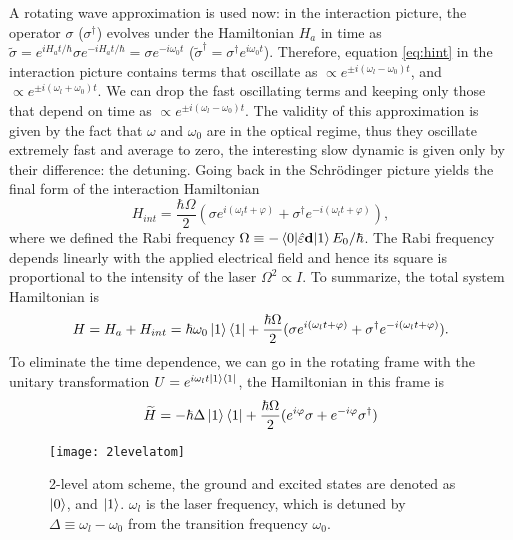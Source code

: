 A rotating wave approximation is used now: in the interaction picture, the operator $\sigma$ ($\sigma^\dagger$) evolves under the Hamiltonian $H_a$ in time as $\widetilde{\sigma} = e^{i H_a t/\hbar}\sigma e^{-i H_a t/\hbar} = \sigma e^{-i\omega_0 t}$ ($\widetilde{\sigma}^\dagger=\sigma^\dagger e^{i\omega_0 t}$). Therefore, equation \ref{eq:hint} in the interaction picture contains terms that oscillate as $\propto e^{\pm i(\omega_l-\omega_0 )t}$, and $\propto e^{\pm i(\omega_l+\omega_0 )t}$. We can drop the fast oscillating terms and keeping only those that depend on time as $\propto e^{\pm i(\omega_l-\omega_0 )t}$. The validity of this approximation is given by the fact that $\omega$ and $\omega_0$ are in the optical regime, thus they oscillate extremely fast and average to zero, the interesting slow dynamic is given only by their difference: the detuning.
Going back in the Schrödinger picture yields the final form of the interaction Hamiltonian
\begin{equation}
H_{int} = \frac{\hbar \Omega}{2}(\sigma e^{i(\omega_l t+\varphi)} + \sigma^\dagger e^{-i(\omega_l t+\varphi)}),
\end{equation}
 where we defined the Rabi frequency $\Omega \equiv - \braket{0|\hat{\varepsilon} \mathbf{d}|1}E_0/\hbar$. The Rabi frequency depends linearly with the applied electrical field and hence its square is proportional to the intensity of the laser $\Omega ^2 \propto I$. To summarize, the total system Hamiltonian is
 \begin{equation}
 \label{2levelatomhamiltonian}
H = H_a + H_{int} = \hbar\omega_0 \ket{1}\bra{1} + \frac{\hbar \Omega}{2}(\sigma e^{i(\omega_l t+\varphi)} + \sigma^\dagger e^{-i(\omega_l t+\varphi)}).
 \end{equation}
To eliminate the time dependence, we can go in the rotating frame with the unitary transformation $U = e^{i\omega_l t \ket{1}\bra{1}}$, the Hamiltonian in this frame is
\begin{equation}
\label{Hamiltonianrotatingframe}
\widetilde{H} = -\hbar \Delta \ket{1}\bra{1} + \frac{\hbar \Omega}{2}(e^{i\varphi}\sigma + e^{-i\varphi}\sigma^\dagger)
\end{equation}
\begin{figure}
\centering
\texttt{[image: 2levelatom]}
\caption{2-level atom scheme, the ground and excited states are denoted as $\ket{0}$, and $\ket{1}$. $\omega_l$ is the laser frequency, which is detuned by $\Delta \equiv \omega_l - \omega_0$ from the transition frequency $\omega_0$.}
\label{2levelatom}
\end{figure}
